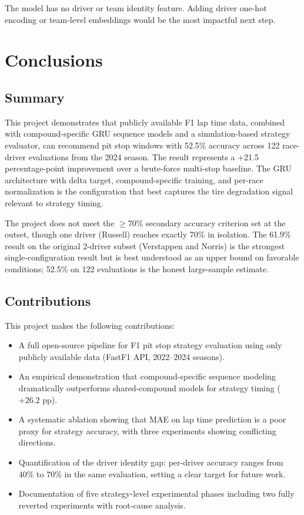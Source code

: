 \documentclass[12pt]{article}
\begin{document}
The model has no driver or team identity feature. Adding driver one-hot encoding or team-level embeddings would be the most impactful next step.

\section{Conclusions}

\subsection{Summary}

This project demonstrates that publicly available F1 lap time data, combined with compound-specific GRU sequence models and a simulation-based strategy evaluator, can recommend pit stop windows with 52.5\% accuracy across 122 race-driver evaluations from the 2024 season. The result represents a +21.5 percentage-point improvement over a brute-force multi-stop baseline. The GRU architecture with delta target, compound-specific training, and per-race normalization is the configuration that best captures the tire degradation signal relevant to strategy timing.

The project does not meet the $\geq$70\% secondary accuracy criterion set at the outset, though one driver (Russell) reaches exactly 70\% in isolation. The 61.9\% result on the original 2-driver subset (Verstappen and Norris) is the strongest single-configuration result but is best understood as an upper bound on favorable conditions; 52.5\% on 122 evaluations is the honest large-sample estimate.

\subsection{Contributions}

This project makes the following contributions:

\begin{itemize}[noitemsep]
    \item A full open-source pipeline for F1 pit stop strategy evaluation using only publicly available data (FastF1 API, 2022--2024 seasons).
    \item An empirical demonstration that compound-specific sequence modeling dramatically outperforms shared-compound models for strategy timing ($+26.2$ pp).
    \item A systematic ablation showing that MAE on lap time prediction is a poor proxy for strategy accuracy, with three experiments showing conflicting directions.
    \item Quantification of the driver identity gap: per-driver accuracy ranges from 40\% to 70\% in the same evaluation, setting a clear target for future work.
    \item Documentation of five strategy-level experimental phases including two fully reverted experiments with root-cause analysis.
\end{itemize}
\end{document}
